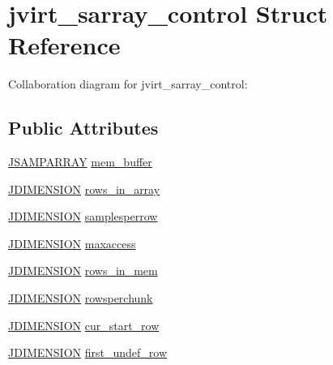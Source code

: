 \hypertarget{structjvirt__sarray__control}{}\section{jvirt\+\_\+sarray\+\_\+control Struct Reference}
\label{structjvirt__sarray__control}


Collaboration diagram for jvirt\+\_\+sarray\+\_\+control\+:
\subsection*{Public Attributes}
\begin{DoxyCompactItemize}
\item 
\hyperlink{jpeglib_8h_ac9d5d1b829ed51769db69a37271a7e91}{J\+S\+A\+M\+P\+A\+R\+R\+A\+Y} \hyperlink{structjvirt__sarray__control_abc1f86c02141d80dc5d443e57a1d36d6}{mem\+\_\+buffer}
\item 
\hyperlink{jmorecfg_8h_a04ed4674f6f1d0d50ec241531e38274f}{J\+D\+I\+M\+E\+N\+S\+I\+O\+N} \hyperlink{structjvirt__sarray__control_a17d42465a9cedfd4feeb93edfd8d134a}{rows\+\_\+in\+\_\+array}
\item 
\hyperlink{jmorecfg_8h_a04ed4674f6f1d0d50ec241531e38274f}{J\+D\+I\+M\+E\+N\+S\+I\+O\+N} \hyperlink{structjvirt__sarray__control_a3b6c756c3a71dc8023672093a60cc4f1}{samplesperrow}
\item 
\hyperlink{jmorecfg_8h_a04ed4674f6f1d0d50ec241531e38274f}{J\+D\+I\+M\+E\+N\+S\+I\+O\+N} \hyperlink{structjvirt__sarray__control_a719350d4faf724c6617a5892aae8ec2a}{maxaccess}
\item 
\hyperlink{jmorecfg_8h_a04ed4674f6f1d0d50ec241531e38274f}{J\+D\+I\+M\+E\+N\+S\+I\+O\+N} \hyperlink{structjvirt__sarray__control_aac15348d4b307c8aacc631b96aa3b547}{rows\+\_\+in\+\_\+mem}
\item 
\hyperlink{jmorecfg_8h_a04ed4674f6f1d0d50ec241531e38274f}{J\+D\+I\+M\+E\+N\+S\+I\+O\+N} \hyperlink{structjvirt__sarray__control_ad1c55661955e1600d447ad754c6aece1}{rowsperchunk}
\item 
\hyperlink{jmorecfg_8h_a04ed4674f6f1d0d50ec241531e38274f}{J\+D\+I\+M\+E\+N\+S\+I\+O\+N} \hyperlink{structjvirt__sarray__control_a84ae28e5bf362228d7f43b486239e873}{cur\+\_\+start\+\_\+row}
\item 
\hyperlink{jmorecfg_8h_a04ed4674f6f1d0d50ec241531e38274f}{J\+D\+I\+M\+E\+N\+S\+I\+O\+N} \hyperlink{structjvirt__sarray__control_a049e8066e21d2fca662be25e4365259a}{first\+\_\+undef\+\_\+row}
\item 

\end{DoxyCompactItemize}
